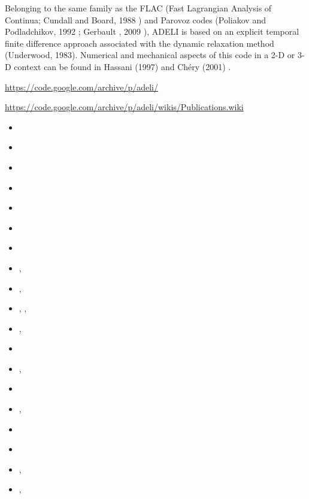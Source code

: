 \begin{itemize}
Belonging to the same family as the FLAC 
(Fast Lagrangian Analysis of Continua; Cundall and Board, 1988 \cite{cubo88}) 
and Parovoz codes 
(Poliakov and Podladchikov, 1992 \cite{popo92}; Gerbault \etal, 2009 \cite{gecm09}), 
ADELI is based on an explicit temporal
finite difference approach associated with the dynamic relaxation method (Underwood, 1983). 
Numerical and mechanical aspects of this code in a 2-D or 3-D context can be 
found in Hassani \etal (1997) \cite{hajc97} and Ch\'ery \etal (2001) \cite{chzh01}.

\url{https://code.google.com/archive/p/adeli/}

\url{https://code.google.com/archive/p/adeli/wikis/Publications.wiki}

\begin{scriptsize}
\begin{itemize}
\item[\nineteenninetysix] \textcite{hach96b}
\item[\nineteenninetyseven] \textcite{hajc97}
\item[\nineteenninetyeight] \textcite{huhc98}
\item[\nineteenninetynine] \textcite{vajh99}
\item[\twothousand] \textcite{lecd00}
\item[\twothousandone] \textcite{chzh01}
\item[\twothousandthree] \textcite{prch03}
\item[\twothousandfour] \textcite{gocl04}, \textcite{bejh04}
\item[\twothousandsix] \textcite{vech06}, \textcite{golc06}
\item[\twothousandeight] \textcite{boht08a,boht08b}, \textcite{gomm08}, \textcite{netv08}
\item[\twothousandtwelve] \textcite{gech12}, \textcite{gigh12}
\item[\twothousandthirteen] \textcite{wahd13}
\item[\twothousandfourteen] \textcite{cehg14}, \textcite{mehn14}
\item[\twothousandfifteen] \textcite{ceag15}
\item[\twothousandeighteen] \textcite{cegm18}, \textcite{gehn18}
\item[\twothousandnineteen] \textcite{tamg19}
\item[\twothousandtwenty] \textcite{cear20}
\item[\twothousandtwentyone] \textcite{siht21}, \textcite{ceha21} 
\item[\twothousandtwentytwo] \textcite{gefp22}, \textcite{gefp22} 
\end{itemize}
\end{scriptsize}


\end{itemize}
